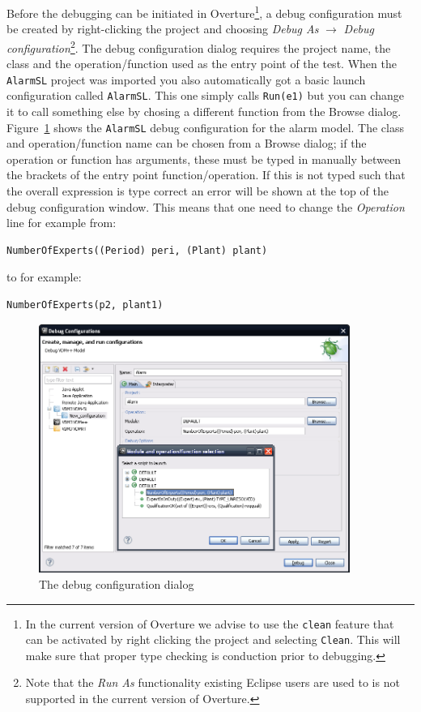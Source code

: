 {Before the debugging can be initiated in Overture\footnote{In the
  current version of Overture we advise to use the \texttt{clean}
  feature that can be activated by right clicking the project and
  selecting \texttt{Clean}. This will make sure that proper type
  checking is conduction prior to debugging.}, a debug
configuration must be created by right-clicking the project and
choosing \emph{Debug As} $ \rightarrow $ \emph{Debug
configuration}\footnote{Note that the
  \emph{Run As} functionality existing Eclipse users are used to is
  not supported in the current version of Overture.}. 
The debug configuration dialog requires the project
name, the class and the operation/function used as the entry point of the
test. When the \texttt{AlarmSL} project was imported you also
automatically got a basic launch configuration called
\texttt{AlarmSL}. This one simply calls \texttt{Run(e1)} but you can
change it to call something else by chosing a different function from
the Browse dialog.
Figure~\ref{fig:debugConfiguration} shows the \texttt{AlarmSL} debug
configuration for the alarm model. The class and operation/function
name can be chosen from a Browse dialog; if the operation or function
has arguments, these must be typed in manually between the brackets of
the entry point function/operation. If this is not typed such that the
overall expression is type correct an error will be shown at the top
of the debug configuration window. This means that one need to change
the \emph{Operation} line for example from:
  
\begin{lstlisting}
NumberOfExperts((Period) peri, (Plant) plant)
\end{lstlisting}
\noindent to for example:
\begin{lstlisting}
NumberOfExperts(p2, plant1)
\end{lstlisting}

\begin{figure}[htp]
\begin{center}
  \includegraphics[width=4in]{figures/DebugConfiguration}
  \caption{The debug configuration dialog}
  \label{fig:debugConfiguration}
\end{center}
\end{figure}

}
